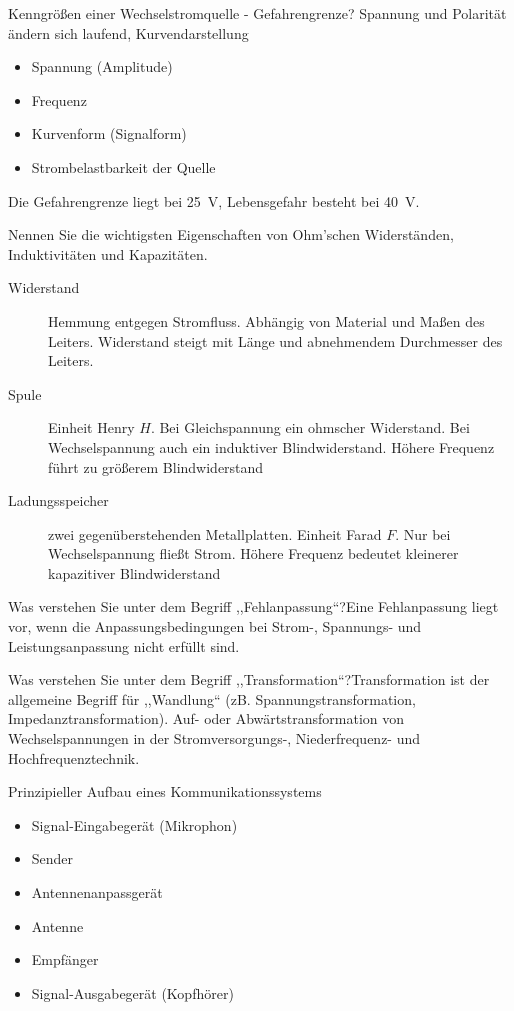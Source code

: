\documentclass[avery5371,grid,frame,a4paper]{flashcards}
\newcommand{\card}[3]{
  \begin{flashcard}[{\chap} -- #1]{#2}#3\end{flashcard}
}
\begin{document}
\card{05}{Kenngrößen einer Wechselstromquelle - Gefahrengrenze?}{
  Spannung und Polarität ändern sich laufend, Kurvendarstellung

  \begin{itemize}
    \item Spannung (Amplitude)
    \item Frequenz
    \item Kurvenform (Signalform)
    \item Strombelastbarkeit der Quelle
  \end{itemize}

  Die Gefahrengrenze liegt bei 25~V, Lebensgefahr besteht bei 40~V.
}
\card{06}{Nennen Sie die wichtigsten Eigenschaften von Ohm'schen Widerständen, Induktivitäten und Kapazitäten.}{
  \footnotesize
  \begin{description}
    \item[Widerstand] Hemmung entgegen Stromfluss. Abhängig von Material und Maßen des Leiters. Widerstand steigt mit Länge und abnehmendem Durchmesser des Leiters.
    \item[Spule] Einheit Henry $H$. Bei Gleichspannung ein ohmscher Widerstand. Bei Wechselspannung auch ein induktiver Blindwiderstand. Höhere Frequenz führt zu größerem Blindwiderstand
    \item[Ladungsspeicher] zwei gegenüberstehenden Metallplatten. Einheit Farad $F$. Nur bei Wechselspannung fließt Strom. Höhere Frequenz bedeutet kleinerer kapazitiver Blindwiderstand
  \end{description}
}
\card{07}{Was verstehen Sie unter dem Begriff ,,Fehlanpassung``?}{Eine Fehlanpassung liegt vor, wenn die Anpassungsbedingungen bei Strom-, Spannungs- und Leistungsanpassung nicht erfüllt sind.}
\card{08}{Was verstehen Sie unter dem Begriff ,,Transformation``?}{Transformation ist der allgemeine Begriff für ,,Wandlung`` (zB. Spannungstransformation, Impedanztransformation). Auf- oder Abwärtstransformation von Wechselspannungen in der Stromversorgungs-, Niederfrequenz- und Hochfrequenztechnik.}
\card{09}{Prinzipieller Aufbau eines Kommunikationssystems}{
  \begin{itemize}
    \item Signal-Eingabegerät (Mikrophon)
    \item Sender
    \item Antennenanpassgerät
    \item Antenne
    \item Empfänger
    \item Signal-Ausgabegerät (Kopfhörer)
  \end{itemize}
}
\end{document}
